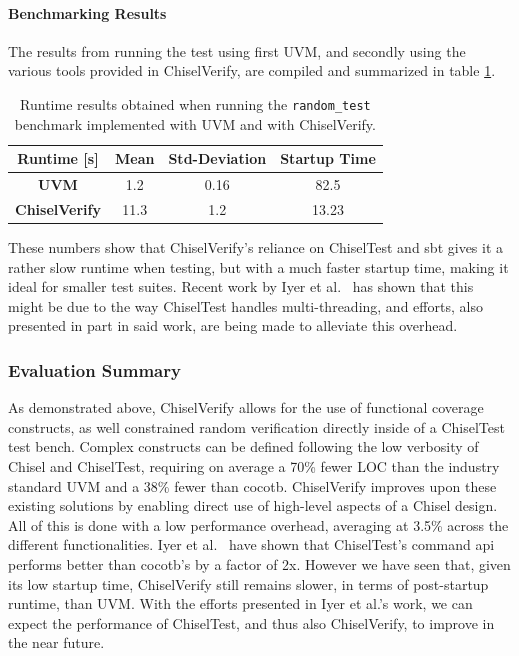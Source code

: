 \documentclass[conference]{IEEEtran}
\newcommand{\todo}[1]{{\color{olive} TODO: #1}}
\begin{document}
\paragraph{Benchmarking Results}
The results from running the test using first UVM, and secondly using the various tools provided in ChiselVerify, are compiled and summarized in table \ref{tab:perfresults}.
\begin{table}[h]
\centering
\begin{tabular}{|c|c|c|c|}
\hline
\textbf{Runtime {[}s{]}} & \textbf{Mean} & \textbf{Std-Deviation} & \textbf{Startup Time} \\ \hline
\textbf{UVM}             & 1.2           & 0.16                   & 82.5                  \\ \hline
\textbf{ChiselVerify}    & 11.3            & 1.2                      & 13.23                 \\ \hline
\end{tabular}
\caption{Runtime results obtained when running the \texttt{random\_test} benchmark implemented with UVM and with ChiselVerify.}
\label{tab:perfresults}
\end{table}

These numbers show that ChiselVerify's reliance on ChiselTest and sbt gives it a rather slow runtime when testing, but with a much faster startup time, making it ideal for smaller test suites.
Recent work by Iyer et al.\ \cite{highperftestapi:Iyer2022} has shown that this might be due to the way ChiselTest handles multi-threading, and efforts, also presented in part in said work, are being made to alleviate this overhead.

\subsubsection{Evaluation Summary}
As demonstrated above, ChiselVerify allows for the use of functional coverage constructs, as well constrained random verification directly inside of a ChiselTest test bench. 
Complex constructs can be defined following the low verbosity of Chisel and ChiselTest, requiring on average a 70\% fewer LOC than the industry standard UVM and a 38\% fewer than cocotb.
ChiselVerify improves upon these existing solutions by enabling direct use of high-level aspects of a Chisel design.
All of this is done with a low performance overhead, averaging at 3.5\% across the different functionalities.
Iyer et al.\ \cite{highperftestapi:Iyer2022} have shown that ChiselTest's command api performs better than cocotb's by a factor of 2x.
However we have seen that, given its low startup time, ChiselVerify still remains slower, in terms of post-startup runtime, than UVM.
With the efforts presented in Iyer et al.'s work, we can expect the performance of ChiselTest, and thus also ChiselVerify, to improve in the near future.
\end{document}
